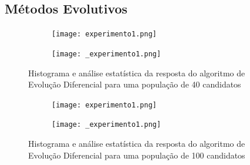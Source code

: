 \documentclass{article}
\begin{document}
\subsection{Métodos Evolutivos}

\begin{figure}[H]
\centering
\begin{subfigure}{0.5\textwidth}
  \centering
  \texttt{[image: experimento1.png]}
\end{subfigure}%
\begin{subfigure}{0.5\textwidth}
  \centering
  \texttt{[image: \_experimento1.png]}
\end{subfigure}
\caption{Histograma e análise estatística da resposta do algoritmo de Evolução Diferencial para uma população de 40 candidatos}
\label{fig:evolutivo1}
\end{figure}


\begin{figure}[H]
\centering
\begin{subfigure}{0.5\textwidth}
  \centering
  \texttt{[image: experimento1.png]}
\end{subfigure}%
\begin{subfigure}{0.5\textwidth}
  \centering
  \texttt{[image: \_experimento1.png]}
\end{subfigure}
\caption{Histograma e análise estatística da resposta do algoritmo de Evolução Diferencial para uma população de 100 candidatos}
\label{fig:evolutivo2}
\end{figure}
\end{document}
